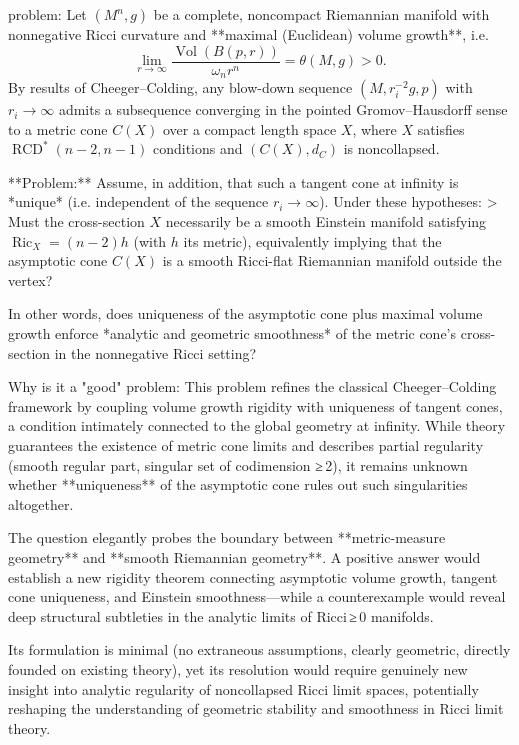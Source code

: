 problem:  
Let \((M^n, g)\) be a complete, noncompact Riemannian manifold with nonnegative Ricci curvature and **maximal (Euclidean) volume growth**, i.e.  
\[
\lim_{r\to\infty} \frac{\operatorname{Vol}(B(p,r))}{\omega_n r^n} = \theta(M,g) > 0.
\]
By results of Cheeger–Colding, any blow-down sequence \((M, r_i^{-2}g, p)\) with \(r_i \to \infty\) admits a subsequence converging in the pointed Gromov–Hausdorff sense to a metric cone \(C(X)\) over a compact length space \(X\), where \(X\) satisfies \(\operatorname{RCD}^*(n-2,n-1)\) conditions and \((C(X),d_C)\) is noncollapsed.

**Problem:**  
Assume, in addition, that such a tangent cone at infinity is *unique* (i.e. independent of the sequence \(r_i\to\infty\)). Under these hypotheses:
> Must the cross-section \(X\) necessarily be a smooth Einstein manifold satisfying \(\operatorname{Ric}_X = (n-2)h\) (with \(h\) its metric), equivalently implying that the asymptotic cone \(C(X)\) is a smooth Ricci-flat Riemannian manifold outside the vertex?

In other words, does uniqueness of the asymptotic cone plus maximal volume growth enforce *analytic and geometric smoothness* of the metric cone’s cross-section in the nonnegative Ricci setting?

Why is it a "good" problem:  
This problem refines the classical Cheeger–Colding framework by coupling volume growth rigidity with uniqueness of tangent cones, a condition intimately connected to the global geometry at infinity. While theory guarantees the existence of metric cone limits and describes partial regularity (smooth regular part, singular set of codimension ≥ 2), it remains unknown whether **uniqueness** of the asymptotic cone rules out such singularities altogether.  

The question elegantly probes the boundary between **metric-measure geometry** and **smooth Riemannian geometry**. A positive answer would establish a new rigidity theorem connecting asymptotic volume growth, tangent cone uniqueness, and Einstein smoothness—while a counterexample would reveal deep structural subtleties in the analytic limits of Ricci ≥ 0 manifolds.  

Its formulation is minimal (no extraneous assumptions, clearly geometric, directly founded on existing theory), yet its resolution would require genuinely new insight into analytic regularity of noncollapsed Ricci limit spaces, potentially reshaping the understanding of geometric stability and smoothness in Ricci limit theory.